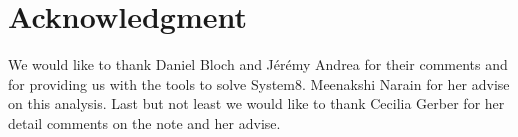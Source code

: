 

\maketitle %

 
\setcounter{page}{2}
 

\label{sec:intro}



\label{sec:taggingalgos}


\label{sec:distributions}

\clearpage

\label{sec:system8}


\clearpage

\label{sec:avg_results}
\clearpage

\label{sec:binned_results}


\label{sec:conclusions}

\section{Acknowledgment} 
We would like to thank Daniel Bloch and J\'er\'emy Andrea for their comments and for providing
us with the tools to solve System8. Meenakshi Narain for her advise on this analysis. Last but not
least we would like to thank Cecilia Gerber for her detail comments on the note and her
advise.

\appendix


